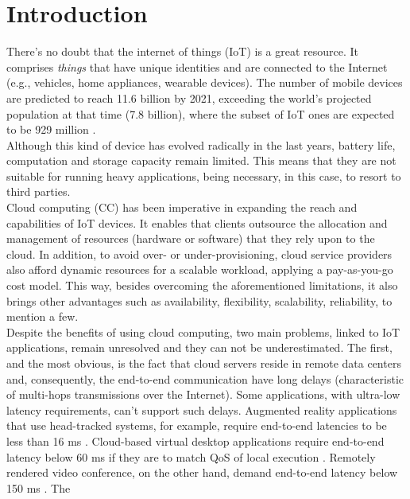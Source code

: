 \section{Introduction}\label{sec:Introduction}
\noindent
There’s no doubt that the internet of things (IoT) is a great resource. It
comprises \textit{things} that have unique identities and are connected to the
Internet (e.g., vehicles, home appliances, wearable devices). The number of
mobile devices are predicted to reach 11.6 billion by 2021, exceeding the
world’s projected population at that time (7.8 billion), where the subset of IoT ones are expected to be 929 million \cite{CiscoVis16:online}.\\
\noindent\tab Although this kind of device has evolved radically in the last
years, battery life, computation and storage capacity remain limited. This means
that they are not suitable for running heavy applications, being necessary, in
this case, to resort to third parties.\\
\noindent\tab Cloud computing (CC) has been imperative in expanding the reach and
capabilities of IoT devices. It enables that clients outsource the allocation
and management of resources (hardware or software) that they rely upon to the
cloud. In addition, to avoid over- or under-provisioning, cloud service
providers also afford dynamic resources for a scalable workload, applying a
pay-as-you-go cost model. This way, besides overcoming the aforementioned
limitations, it also brings other advantages such as availability, flexibility,
scalability, reliability, to mention a few.\\
\noindent\tab Despite the benefits of using cloud computing, two main problems,
linked to IoT applications, remain unresolved and they can not be
underestimated. The first, and the most obvious, is the fact that cloud servers
reside in remote data centers and, consequently, the end-to-end communication
have long delays (characteristic of multi-hops transmissions over the Internet).
Some applications, with ultra-low latency requirements, can't support such
delays.  Augmented reality applications that use head-tracked systems, for
example, require end-to-end latencies to be less than 16 ms
\cite{ellis2004generalizeability}. Cloud-based virtual desktop applications
require end-to-end latency below 60 ms if they are to match QoS of local
execution \cite{taylor2015virtual}. Remotely rendered video conference, on the
other hand, demand end-to-end latency below 150 ms \cite{szigeti2005end}. The
